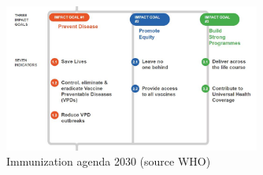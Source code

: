 \documentclass{article}
\begin{document}
    \begin{figure}
        \centering
        \includegraphics[width=0.75\textwidth]{imgs/Objectives.JPG}
        \caption{Immunization agenda 2030 (source WHO)}
        \label{fig:responses9}
    \end{figure}

    








\end{document}
